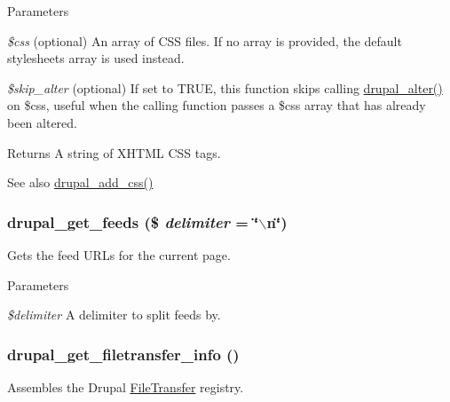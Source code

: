 \begin{DoxyParams}{Parameters}
\item[{\em \$css}](optional) An array of CSS files. If no array is provided, the default stylesheets array is used instead. \item[{\em \$skip\_\-alter}](optional) If set to TRUE, this function skips calling \hyperlink{module_8inc_a0a8742a524bbb674b6c6a26755765007}{drupal\_\-alter()} on \$css, useful when the calling function passes a \$css array that has already been altered.\end{DoxyParams}
\begin{DoxyReturn}{Returns}
A string of XHTML CSS tags.
\end{DoxyReturn}
\begin{DoxySeeAlso}{See also}
\hyperlink{common_8inc_a2c5bb2667efb44b02f1a105c0bfdebe5}{drupal\_\-add\_\-css()} 
\end{DoxySeeAlso}
\hypertarget{common_8inc_ac7df9703641369003434d49cf917c16e}{
\subsubsection[{drupal\_\-get\_\-feeds}]{\setlength{\rightskip}{0pt plus 5cm}drupal\_\-get\_\-feeds (\$ {\em delimiter} = {\ttfamily \char`\"{}$\backslash$n\char`\"{}})}}
\label{common_8inc_ac7df9703641369003434d49cf917c16e}
Gets the feed URLs for the current page.


\begin{DoxyParams}{Parameters}
\item[{\em \$delimiter}]A delimiter to split feeds by. \end{DoxyParams}
\hypertarget{common_8inc_a9530d4fd3eee97770ebaaa5103d24bf4}{
\subsubsection[{drupal\_\-get\_\-filetransfer\_\-info}]{\setlength{\rightskip}{0pt plus 5cm}drupal\_\-get\_\-filetransfer\_\-info ()}}
\label{common_8inc_a9530d4fd3eee97770ebaaa5103d24bf4}
Assembles the Drupal \hyperlink{classFileTransfer}{FileTransfer} registry.

